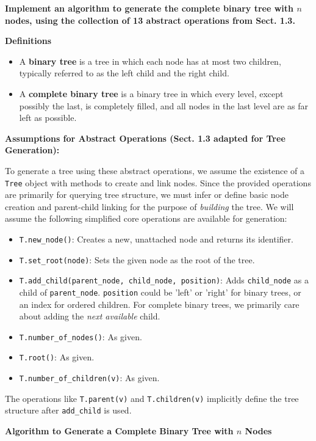 \documentclass{article}
\begin{document}
\textbf{Implement an algorithm to generate the complete binary tree with $n$ nodes, using the collection of 13 abstract operations from Sect. 1.3.}

\textbf{Definitions}

\begin{itemize}
    \item A \textbf{binary tree} is a tree in which each node has at most two children, typically referred to as the left child and the right child.
    \item A \textbf{complete binary tree} is a binary tree in which every level, except possibly the last, is completely filled, and all nodes in the last level are as far left as possible.
\end{itemize}

\textbf{Assumptions for Abstract Operations (Sect. 1.3 adapted for Tree Generation):}

To generate a tree using these abstract operations, we assume the existence of a \texttt{Tree} object with methods to create and link nodes. Since the provided operations are primarily for querying tree structure, we must infer or define basic node creation and parent-child linking for the purpose of \textit{building} the tree. We will assume the following simplified core operations are available for generation:
\begin{itemize}
    \item \texttt{T.new\_node()}: Creates a new, unattached node and returns its identifier.
    \item \texttt{T.set\_root(node)}: Sets the given node as the root of the tree.
    \item \texttt{T.add\_child(parent\_node, child\_node, position)}: Adds \texttt{child\_node} as a child of \texttt{parent\_node}. \texttt{position} could be 'left' or 'right' for binary trees, or an index for ordered children. For complete binary trees, we primarily care about adding the \textit{next available} child.
    \item \texttt{T.number\_of\_nodes()}: As given.
    \item \texttt{T.root()}: As given.
    \item \texttt{T.number\_of\_children(v)}: As given.
\end{itemize}
The operations like \texttt{T.parent(v)} and \texttt{T.children(v)} implicitly define the tree structure after \texttt{add\_child} is used.

\textbf{Algorithm to Generate a Complete Binary Tree with $n$ Nodes}
\end{document}
